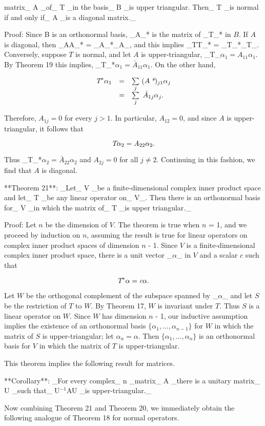 matrix_ A _of_ T _in the basis_ B _is upper triangular. Then_ T _is normal if and only if_ A _is a diagonal matrix._

Proof: Since B is an orthonormal basis, _A_* is the matrix of _T_* in \(B\). If \(A\) is diagonal, then _AA_* = _A_*_A_, and this implies _TT_* = _T_*_T_. Conversely, suppose \(T\) is normal, and let \(A\) is upper-triangular, _T_\(\alpha_{1}=A_{11}\alpha_{1}\). By Theorem 19 this implies, _T_*\(\alpha_{1}=\bar{A}_{11}\alpha_{1}\). On the other hand,

\[\begin{array}{rcl}\mbox{\it T}^{*}\alpha_{1}&=&\sum\limits_{j}\ (A\,\mbox{\it*})_{j1}\alpha_{j}\\ &=&\sum\limits_{j}\ \bar{A}_{1j}\alpha_{j}.\end{array}\]

Therefore, \(A_{1j}=0\) for every \(j>1\). In particular, \(A_{12}=0\), and since \(A\) is upper-triangular, it follows that

\[\mbox{\it T}\alpha_{2}=\mbox{\it A}_{22}\alpha_{2}.\]

Thus _T_*\(\alpha_{2}=\bar{A}_{22}\alpha_{2}\) and \(A_{2j}=0\) for all \(j\neq 2\). Continuing in this fashion, we find that \(A\) is diagonal.

**Theorem 21**: _Let_ V _be a finite-dimensional complex inner product space and let_ T _be any linear operator on_ V_. Then there is an orthonormal basis for_ V _in which the matrix of_ T _is upper triangular._

Proof: Let \(n\) be the dimension of \(V\). The theorem is true when \(n\) = 1, and we proceed by induction on \(n\), assuming the result is true for linear operators on complex inner product spaces of dimension \(n\) - 1. Since \(V\) is a finite-dimensional complex inner product space, there is a unit vector _\(\alpha\)_ in \(V\) and a scalar \(c\) such that

\[\mbox{\it T}^{*}\alpha=\mbox{\it c}\alpha.\]

Let \(W\) be the orthogonal complement of the subspace spanned by _\(\alpha\)_ and let \(S\) be the restriction of \(T\) to \(W\). By Theorem 17, \(W\) is invariant under \(T\). Thus \(S\) is a linear operator on \(W\). Since \(W\) has dimension \(n\) - 1, our inductive assumption implies the existence of an orthonormal basis \(\{\alpha_{1},\ldots,\alpha_{n-1}\}\) for \(W\) in which the matrix of \(S\) is upper-triangular; let \(\alpha_{n}=\alpha\). Then \(\{\alpha_{1},\ldots,\alpha_{n}\}\) is an orthonormal basis for \(V\) in which the matrix of \(T\) is upper-triangular.

This theorem implies the following result for matrices.

**Corollary**: _For every complex_ n _matrix_ A _there is a unitary matrix_ U _such that_ U\({}^{-1}\)AU _is upper-triangular._

Now combining Theorem 21 and Theorem 20, we immediately obtain the following analogue of Theorem 18 for normal operators.

 
